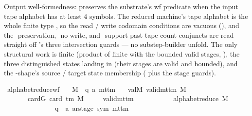 \begin{isabellebody}
\begin{isamarkuptext}
Output well-formedness:  preserves the
  substrate's wf predicate when the input tape alphabet has at
  least 4 symbols.  The reduced machine's tape alphabet is the whole
  finite type , so the read / write codomain conditions are
  vacuous (), and the -preservation,
  -no-write, and \isa{{\isasymdelta}}-support-past-tape-count
  conjuncts are read straight off 's three
  intersection guards — no substep-builder unfold.  The only structural
  work is finite  (product of finite  with the
  bounded valid stages, ), the three
  distinguished states landing in  (their stages are valid and
  bounded), and the \isa{{\isasymdelta}}-shape's source / target state
  membership ( plus the stage
  guards).%
\end{isamarkuptext}\isamarkuptrue%
\isamarkupfalse%
\ alphabet{\isacharunderscore}{\kern0pt}reduce{\isacharunderscore}{\kern0pt}wf{\isacharcolon}{\kern0pt}\isanewline
\ \ \ M\ {\isacharcolon}{\kern0pt}{\isacharcolon}{\kern0pt}\ {\isachardoublequoteopen}{\isacharparenleft}{\kern0pt}{\isacharprime}{\kern0pt}q{\isacharcomma}{\kern0pt}\ {\isacharprime}{\kern0pt}a{\isacharparenright}{\kern0pt}\ mttm{\isachardoublequoteclose}\isanewline
\ \ \ valM{\isacharcolon}{\kern0pt}\ {\isachardoublequoteopen}valid{\isacharunderscore}{\kern0pt}mttm\ M{\isachardoublequoteclose}\isanewline
\ \ \ \ \ \ \ cardG{\isacharcolon}{\kern0pt}\ {\isachardoublequoteopen}card\ {\isacharparenleft}{\kern0pt}{\isasymGamma}{\isacharunderscore}{\kern0pt}tm\ M{\isacharparenright}{\kern0pt}\ {\isasymge}\ {}{\isachardoublequoteclose}\isanewline
\ \ \ {\isachardoublequoteopen}valid{\isacharunderscore}{\kern0pt}mttm\isanewline
\ \ \ \ \ \ \ \ \ \ \ {\isacharparenleft}{\kern0pt}alphabet{\isacharunderscore}{\kern0pt}reduce\ M\isanewline
\ \ \ \ \ \ \ \ \ \ \ \ \ \ {\isacharcolon}{\kern0pt}{\isacharcolon}{\kern0pt}\ {\isacharparenleft}{\kern0pt}{\isacharprime}{\kern0pt}q\ {\isasymtimes}\ {\isacharprime}{\kern0pt}a\ ar{\isacharunderscore}{\kern0pt}stage{\isacharcomma}{\kern0pt}\ sym{}{\isacharparenright}{\kern0pt}\ mttm{\isacharparenright}{\kern0pt}{\isachardoublequoteclose}\isanewline

\end{isabellebody}

